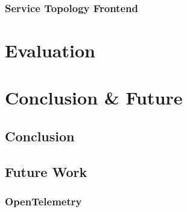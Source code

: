 \documentclass[12pt,pdftex,titlepage]{report}
\begin{document}
            \subsection{Service Topology Frontend}
            

    \chapter{Evaluation}
    
    \chapter{Conclusion \& Future}
        \section{Conclusion}

        \section{Future Work}
            \subsection{OpenTelemetry}
\end{document}
